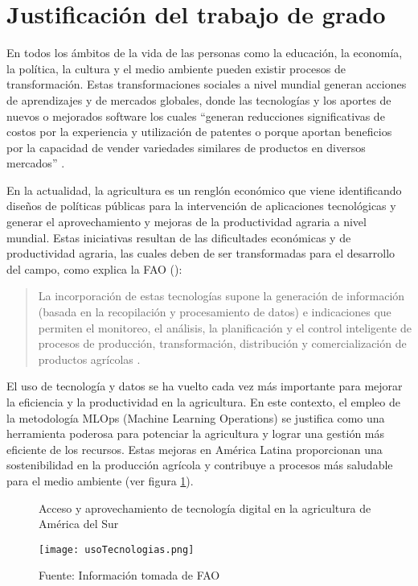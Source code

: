 \section{Justificación del trabajo de grado}
En todos los ámbitos de la vida de las personas como la educación, la economía, la política, la cultura y el medio ambiente pueden existir procesos de transformación. Estas transformaciones sociales a nivel mundial generan acciones de aprendizajes y de mercados globales, donde las tecnologías y los aportes de nuevos o mejorados software los cuales  “generan reducciones significativas de costos por la experiencia y utilización de patentes o porque aportan beneficios por la capacidad de vender variedades similares de productos en diversos mercados” \citep[p. 27]{vela2012}.

En la actualidad, la agricultura es un renglón económico que viene identificando diseños de políticas públicas para la intervención de aplicaciones tecnológicas y generar el aprovechamiento y mejoras de la productividad agraria a nivel mundial. Estas iniciativas resultan de las dificultades económicas y de productividad agraria, las cuales deben de ser transformadas para el desarrollo del campo, como explica la FAO (\citeyear{fao2021}):

\begin{quote}
    La incorporación de estas tecnologías supone la generación de información (basada en la recopilación y procesamiento de datos) e indicaciones que permiten el monitoreo, el análisis, la planificación y el control inteligente de procesos de producción, transformación, distribución y comercialización de productos agrícolas \cite[p.88]{fao2021}.
\end{quote}


El uso de tecnología y datos se ha vuelto cada vez más importante para mejorar la eficiencia y la productividad en la agricultura. En este contexto, el empleo de la metodología MLOps (Machine Learning Operations) se justifica como una herramienta poderosa para potenciar la agricultura y lograr una gestión más eficiente de los recursos. Estas mejoras en América Latina proporcionan una sostenibilidad en la producción agrícola y contribuye a procesos más saludable para el medio ambiente (ver figura \ref{fig:figura1}).

\begin{figure}[h]
\centering
\caption{Acceso y aprovechamiento de tecnología digital en la agricultura de América del Sur}
\texttt{[image: usoTecnologias.png]}
\caption*{\footnotesize Fuente: Información tomada de FAO \citeyear{fao2021}}
\label{fig:figura1}
\end{figure}


